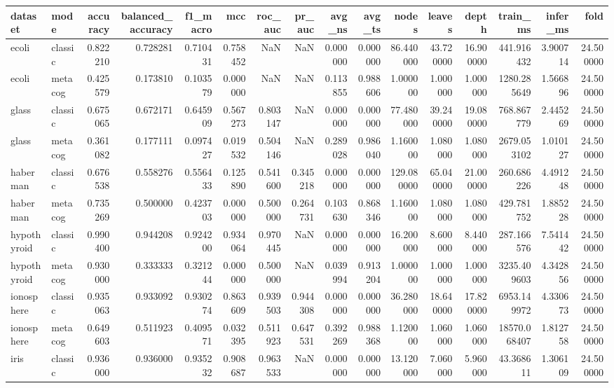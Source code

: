 \begin{tabular}{llrrrrrrrrrrrrrr}
\toprule
dataset & mode & accuracy & balanced_accuracy & f1_macro & mcc & roc_auc & pr_auc & avg_ns & avg_ts & nodes & leaves & depth & train_ms & infer_ms & fold \\
\midrule
ecoli & classic & 0.822210 & 0.728281 & 0.710431 & 0.758452 & NaN & NaN & 0.000000 & 0.000000 & 86.440000 & 43.720000 & 16.900000 & 441.916432 & 3.900714 & 24.500000 \\
ecoli & metacog & 0.425579 & 0.173810 & 0.103579 & 0.000000 & NaN & NaN & 0.113855 & 0.988606 & 1.000000 & 1.000000 & 1.000000 & 1280.285649 & 1.566896 & 24.500000 \\
glass & classic & 0.675065 & 0.672171 & 0.645909 & 0.567273 & 0.803147 & NaN & 0.000000 & 0.000000 & 77.480000 & 39.240000 & 19.080000 & 768.867779 & 2.445269 & 24.500000 \\
glass & metacog & 0.361082 & 0.177111 & 0.097427 & 0.019532 & 0.504146 & NaN & 0.289028 & 0.986040 & 1.160000 & 1.080000 & 1.080000 & 2679.053102 & 1.010127 & 24.500000 \\
haberman & classic & 0.676538 & 0.558276 & 0.556433 & 0.125890 & 0.541600 & 0.345218 & 0.000000 & 0.000000 & 129.080000 & 65.040000 & 21.000000 & 260.686226 & 4.491248 & 24.500000 \\
haberman & metacog & 0.735269 & 0.500000 & 0.423703 & 0.000000 & 0.500000 & 0.264731 & 0.103630 & 0.868346 & 1.160000 & 1.080000 & 1.080000 & 429.781752 & 1.885228 & 24.500000 \\
hypothyroid & classic & 0.990400 & 0.944208 & 0.924200 & 0.934064 & 0.970445 & NaN & 0.000000 & 0.000000 & 16.200000 & 8.600000 & 8.440000 & 287.166576 & 7.541442 & 24.500000 \\
hypothyroid & metacog & 0.930000 & 0.333333 & 0.321244 & 0.000000 & 0.500000 & NaN & 0.039994 & 0.913204 & 1.000000 & 1.000000 & 1.000000 & 3235.409603 & 4.342856 & 24.500000 \\
ionosphere & classic & 0.935063 & 0.933092 & 0.930274 & 0.863609 & 0.939503 & 0.944308 & 0.000000 & 0.000000 & 36.280000 & 18.640000 & 17.820000 & 6953.149972 & 4.330673 & 24.500000 \\
ionosphere & metacog & 0.649603 & 0.511923 & 0.409571 & 0.032395 & 0.511923 & 0.647531 & 0.392269 & 0.988368 & 1.120000 & 1.060000 & 1.060000 & 18570.068407 & 1.812758 & 24.500000 \\
iris & classic & 0.936000 & 0.936000 & 0.935232 & 0.908687 & 0.963533 & NaN & 0.000000 & 0.000000 & 13.120000 & 7.060000 & 5.960000 & 43.368611 & 1.306109 & 24.500000 \\

\end{tabular}
